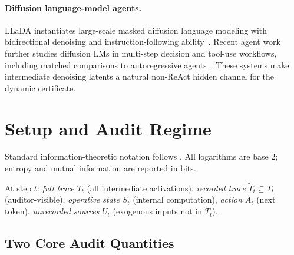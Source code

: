 \documentclass{article}
\begin{document}
\paragraph{Diffusion language-model agents.}
LLaDA instantiates large-scale masked diffusion language modeling with bidirectional denoising and instruction-following ability~\citep{nie2025llada}. Recent agent work further studies diffusion LMs in multi-step decision and tool-use workflows, including matched comparisons to autoregressive agents~\citep{zhen2026dllmagent}. These systems make intermediate denoising latents a natural non-ReAct hidden channel for the dynamic certificate.

\section{Setup and Audit Regime}
\label{sec:setup}

Standard information-theoretic notation follows \citet{cover2006elements}. All logarithms are base 2; entropy and mutual information are reported in bits.

At step $t$: \emph{full trace} $T_t$ (all intermediate activations), \emph{recorded trace} $\tilde T_t \subseteq T_t$ (auditor-visible), \emph{operative state} $S_t$ (internal computation), \emph{action} $A_t$ (next token), \emph{unrecorded sources} $U_t$ (exogenous inputs not in $\tilde T_t$).

\subsection{Two Core Audit Quantities}
\end{document}
